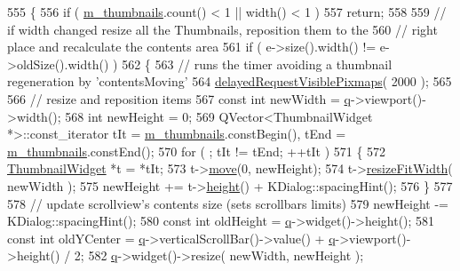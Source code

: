 \begin{DoxyCode}
555 \{
556     \textcolor{keywordflow}{if} ( \hyperlink{classThumbnailListPrivate_adc3638d1cfe0435440c400065ccd20af}{m\_thumbnails}.count() < 1 || width() < 1 )
557         \textcolor{keywordflow}{return};
558 
559     \textcolor{comment}{// if width changed resize all the Thumbnails, reposition them to the}
560     \textcolor{comment}{// right place and recalculate the contents area}
561     \textcolor{keywordflow}{if} ( e->size().width() != e->oldSize().width() )
562     \{
563         \textcolor{comment}{// runs the timer avoiding a thumbnail regeneration by 'contentsMoving'}
564         \hyperlink{classThumbnailListPrivate_a830ad4ac20c8f6d4d8f9cb09def53510}{delayedRequestVisiblePixmaps}( 2000 );
565 
566         \textcolor{comment}{// resize and reposition items}
567         \textcolor{keyword}{const} \textcolor{keywordtype}{int} newWidth = \hyperlink{classThumbnailListPrivate_ae2177fa339c619c575aa337d41465a4f}{q}->viewport()->width();
568         \textcolor{keywordtype}{int} newHeight = 0;
569         QVector<ThumbnailWidget *>::const\_iterator tIt = \hyperlink{classThumbnailListPrivate_adc3638d1cfe0435440c400065ccd20af}{m\_thumbnails}.constBegin(), tEnd = 
      \hyperlink{classThumbnailListPrivate_adc3638d1cfe0435440c400065ccd20af}{m\_thumbnails}.constEnd();
570         \textcolor{keywordflow}{for} ( ; tIt != tEnd; ++tIt )
571         \{
572             \hyperlink{classThumbnailWidget}{ThumbnailWidget} *t = *tIt;
573             t->\hyperlink{classThumbnailWidget_ad35c1fb02e68bb80ce8bbe92ace57ddf}{move}(0, newHeight);
574             t->\hyperlink{classThumbnailWidget_ad7253ea3bd3e10f59c0aeab5cf3fadd8}{resizeFitWidth}( newWidth );
575             newHeight += t->\hyperlink{classThumbnailWidget_a4b3de1b4027c53dd07e52da4ec458494}{height}() + KDialog::spacingHint();
576         \}
577 
578         \textcolor{comment}{// update scrollview's contents size (sets scrollbars limits)}
579         newHeight -= KDialog::spacingHint();
580         \textcolor{keyword}{const} \textcolor{keywordtype}{int} oldHeight = \hyperlink{classThumbnailListPrivate_ae2177fa339c619c575aa337d41465a4f}{q}->widget()->height();
581         \textcolor{keyword}{const} \textcolor{keywordtype}{int} oldYCenter = \hyperlink{classThumbnailListPrivate_ae2177fa339c619c575aa337d41465a4f}{q}->verticalScrollBar()->value() + \hyperlink{classThumbnailListPrivate_ae2177fa339c619c575aa337d41465a4f}{q}->viewport()->height() / 2;
582         \hyperlink{classThumbnailListPrivate_ae2177fa339c619c575aa337d41465a4f}{q}->widget()->resize( newWidth, newHeight );

\end{DoxyCode}
